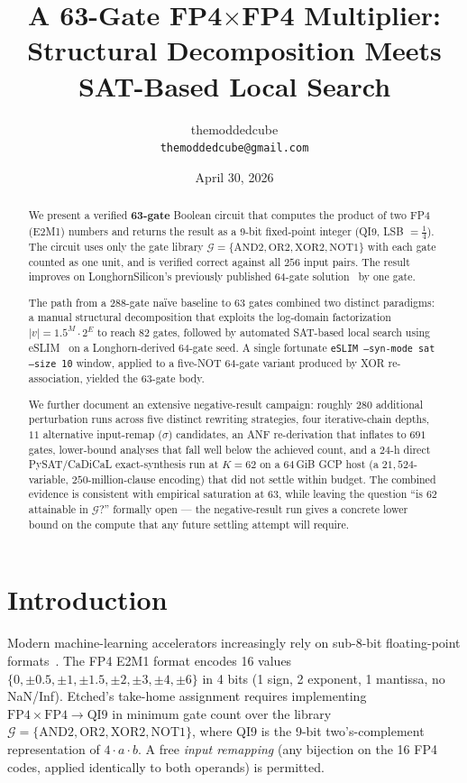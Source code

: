 \documentclass[11pt]{article}
\title{\textbf{A 63-Gate FP4$\times$FP4 Multiplier:\\
Structural Decomposition Meets SAT-Based Local Search}}
\author{themoddedcube\\
\texttt{themoddedcube@gmail.com}}
\date{April 30, 2026}
\begin{document}
\maketitle

\begin{abstract}
We present a verified \textbf{63-gate} Boolean circuit that computes the
product of two FP4 (E2M1) numbers and returns the result as a 9-bit
fixed-point integer (QI9, LSB $= \tfrac{1}{4}$).
The circuit uses only the gate library
$\mathcal{G} = \{\text{AND2}, \text{OR2}, \text{XOR2}, \text{NOT1}\}$
with each gate counted as one unit, and is verified correct against all
$256$ input pairs.
The result improves on LonghornSilicon's previously published
64-gate solution~\cite{longhorn2024} by one gate.

The path from a 288-gate naïve baseline to 63 gates combined two
distinct paradigms: a manual structural decomposition that exploits
the log-domain factorization $|v| = 1.5^M\cdot 2^E$ to reach 82 gates,
followed by automated SAT-based local search using
eSLIM~\cite{reichl2024eslim} on a Longhorn-derived 64-gate seed.
A single fortunate \texttt{eSLIM --syn-mode sat --size 10} window,
applied to a five-NOT 64-gate variant produced by XOR re-association,
yielded the 63-gate body.

We further document an extensive negative-result campaign: roughly
$280$ additional perturbation runs across five distinct rewriting
strategies, four iterative-chain depths, $11$ alternative input-remap
($\sigma$) candidates, an ANF re-derivation that inflates to $691$
gates, lower-bound analyses that fall well below the achieved count,
and a $24$-h direct PySAT/CaDiCaL exact-synthesis run at $K{=}62$ on
a $64$\,GiB GCP host (a $21{,}524$-variable, $250$-million-clause
encoding) that did not settle within budget.
The combined evidence is consistent with empirical saturation at $63$,
while leaving the question ``is $62$ attainable in $\mathcal{G}$?''
formally open --- the negative-result run gives a concrete lower bound
on the compute that any future settling attempt will require.
\end{abstract}

\section{Introduction}

Modern machine-learning accelerators increasingly rely on sub-8-bit
floating-point formats~\cite{micikevicius2022fp8,rouhani2023microscaling}.
The FP4 E2M1 format encodes 16 values
$\{0, \pm 0.5, \pm 1, \pm 1.5, \pm 2, \pm 3, \pm 4, \pm 6\}$ in
4 bits (1 sign, 2 exponent, 1 mantissa, no NaN/Inf).
Etched's take-home assignment requires implementing
$\text{FP4} \times \text{FP4} \to \text{QI9}$ in minimum gate count
over the library $\mathcal{G} = \{\text{AND2},\text{OR2},\text{XOR2},\text{NOT1}\}$,
where QI9 is the 9-bit two's-complement representation of $4\cdot a\cdot b$.
A free \emph{input remapping} (any bijection on the 16 FP4 codes,
applied identically to both operands) is permitted.
\end{document}
